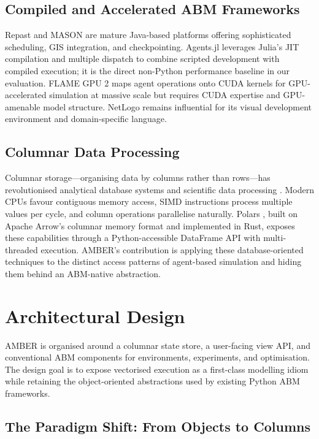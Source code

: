 \documentclass[11pt,a4paper]{article}
\begin{document}
\subsection{Compiled and Accelerated ABM Frameworks}

Repast \citep{north2013complex} and MASON \citep{luke2005mason} are mature Java-based platforms offering sophisticated scheduling, GIS integration, and checkpointing. Agents.jl \citep{datseris2024agents} leverages Julia's JIT compilation and multiple dispatch to combine scripted development with compiled execution; it is the direct non-Python performance baseline in our evaluation. FLAME GPU 2 \citep{richmond2023flame} maps agent operations onto CUDA kernels for GPU-accelerated simulation at massive scale but requires CUDA expertise and GPU-amenable model structure. NetLogo \citep{tisue2004netlogo} remains influential for its visual development environment and domain-specific language.

\subsection{Columnar Data Processing}

Columnar storage---organising data by columns rather than rows---has revolutionised analytical database systems and scientific data processing \citep{arrow2026}. Modern CPUs favour contiguous memory access, SIMD instructions process multiple values per cycle, and column operations parallelise naturally. Polars \citep{polars_zenodo}, built on Apache Arrow's columnar memory format and implemented in Rust, exposes these capabilities through a Python-accessible DataFrame API with multi-threaded execution. AMBER's contribution is applying these database-oriented techniques to the distinct access patterns of agent-based simulation and hiding them behind an ABM-native abstraction.

\section{Architectural Design}
\label{sec:architecture}

AMBER is organised around a columnar state store, a user-facing view API, and conventional ABM components for environments, experiments, and optimisation. The design goal is to expose vectorised execution as a first-class modelling idiom while retaining the object-oriented abstractions used by existing Python ABM frameworks.

\subsection{The Paradigm Shift: From Objects to Columns}
\end{document}
